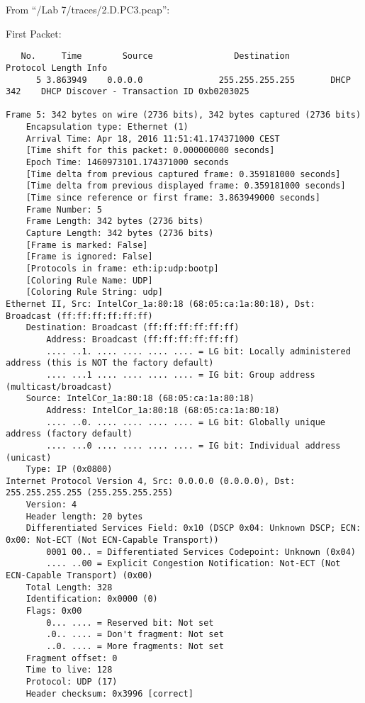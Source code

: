 From ``/Lab 7/traces/2.D.PC3.pcap'':

First Packet:\\

\begin{lstlisting}
   No.     Time        Source                Destination           Protocol Length Info
      5 3.863949    0.0.0.0               255.255.255.255       DHCP     342    DHCP Discover - Transaction ID 0xb0203025

Frame 5: 342 bytes on wire (2736 bits), 342 bytes captured (2736 bits)
    Encapsulation type: Ethernet (1)
    Arrival Time: Apr 18, 2016 11:51:41.174371000 CEST
    [Time shift for this packet: 0.000000000 seconds]
    Epoch Time: 1460973101.174371000 seconds
    [Time delta from previous captured frame: 0.359181000 seconds]
    [Time delta from previous displayed frame: 0.359181000 seconds]
    [Time since reference or first frame: 3.863949000 seconds]
    Frame Number: 5
    Frame Length: 342 bytes (2736 bits)
    Capture Length: 342 bytes (2736 bits)
    [Frame is marked: False]
    [Frame is ignored: False]
    [Protocols in frame: eth:ip:udp:bootp]
    [Coloring Rule Name: UDP]
    [Coloring Rule String: udp]
Ethernet II, Src: IntelCor_1a:80:18 (68:05:ca:1a:80:18), Dst: Broadcast (ff:ff:ff:ff:ff:ff)
    Destination: Broadcast (ff:ff:ff:ff:ff:ff)
        Address: Broadcast (ff:ff:ff:ff:ff:ff)
        .... ..1. .... .... .... .... = LG bit: Locally administered address (this is NOT the factory default)
        .... ...1 .... .... .... .... = IG bit: Group address (multicast/broadcast)
    Source: IntelCor_1a:80:18 (68:05:ca:1a:80:18)
        Address: IntelCor_1a:80:18 (68:05:ca:1a:80:18)
        .... ..0. .... .... .... .... = LG bit: Globally unique address (factory default)
        .... ...0 .... .... .... .... = IG bit: Individual address (unicast)
    Type: IP (0x0800)
Internet Protocol Version 4, Src: 0.0.0.0 (0.0.0.0), Dst: 255.255.255.255 (255.255.255.255)
    Version: 4
    Header length: 20 bytes
    Differentiated Services Field: 0x10 (DSCP 0x04: Unknown DSCP; ECN: 0x00: Not-ECT (Not ECN-Capable Transport))
        0001 00.. = Differentiated Services Codepoint: Unknown (0x04)
        .... ..00 = Explicit Congestion Notification: Not-ECT (Not ECN-Capable Transport) (0x00)
    Total Length: 328
    Identification: 0x0000 (0)
    Flags: 0x00
        0... .... = Reserved bit: Not set
        .0.. .... = Don't fragment: Not set
        ..0. .... = More fragments: Not set
    Fragment offset: 0
    Time to live: 128
    Protocol: UDP (17)
    Header checksum: 0x3996 [correct]

\end{lstlisting}
